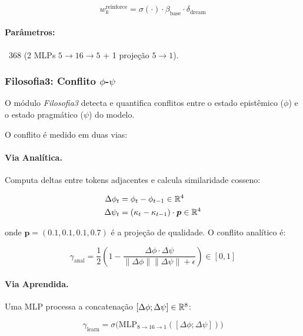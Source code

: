 \begin{equation}
    w_k^{\text{reinforce}} = \sigma(\cdot) \cdot \beta_{\text{base}} \cdot \delta_{\text{dream}}
\end{equation}

\paragraph{Par\^ametros:} ~368 (2 MLPs $5 \to 16 \to 5$ + 1 proje\c{c}\~ao $5 \to 1$).

\subsubsection{Filosofia3: Conflito $\phi$-$\psi$}
\label{sec:filosofia3}

O m\'odulo \textit{Filosofia3} detecta e quantifica conflitos entre
o estado epist\^emico ($\phi$) e o estado pragm\'atico ($\psi$) do modelo.

O conflito \'e medido em duas vias:

\paragraph{Via Anal\'itica.}
Computa deltas entre tokens adjacentes e calcula similaridade cosseno:

\begin{align}
    \Delta\phi_t &= \phi_{t} - \phi_{t-1} \in \mathbb{R}^4 \\
    \Delta\psi_t &= (\kappa_t - \kappa_{t-1}) \cdot \bm{p} \in \mathbb{R}^4
\end{align}

onde $\bm{p} = (0.1, 0.1, 0.1, 0.7)$ \'e a proje\c{c}\~ao de qualidade.
O conflito anal\'itico \'e:

\begin{equation}
    \gamma_{\text{anal}} = \frac{1}{2}\left(1 - \frac{\Delta\phi \cdot \Delta\psi}{\|\Delta\phi\| \|\Delta\psi\| + \epsilon}\right) \in [0, 1]
\end{equation}

\paragraph{Via Aprendida.}
Uma MLP processa a concatena\c{c}\~ao $[\Delta\phi; \Delta\psi] \in \mathbb{R}^8$:

\begin{equation}
    \gamma_{\text{learn}} = \sigma\big(\text{MLP}_{8 \to 16 \to 1}([\Delta\phi; \Delta\psi])\big)
\end{equation}


